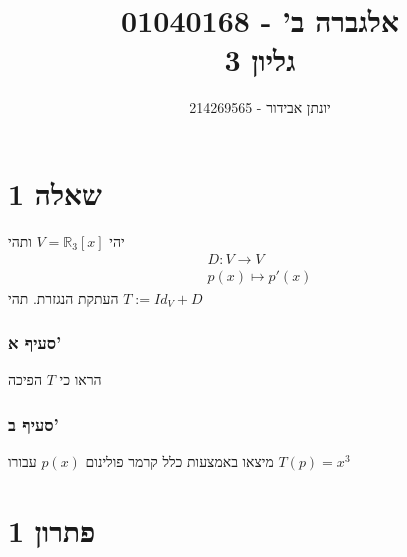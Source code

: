 \documentclass[12pt, titlepage]{article}
\title{אלגברה ב' - 01040168 \\ גליון 3}
\author{יונתן אבידור - 214269565}
\begin{document}
    \newcommand{\adj}[1]{\mathrm{adj}\left(#1\right)}
\maketitle
\pagestyle{fancy}
\fancyhead{}
\part*{שאלה 1}
יהי $V=\mathbb{R}_3\left[x\right]$ ותהי
\begin{gather*}
    D: V\to V\\
    p\left(x\right) \mapsto p'\left(x\right)
\end{gather*}
העתקת הנגזרת. תהי $T:=Id_V  +D$
\section*{סעיף א'}
 הראו כי $T$ הפיכה
 \section*{סעיף ב'}
 מיצאו באמצעות כלל קרמר פולינום $p\left(x\right)$ עבורו $T\left(p\right)=x^3$
\part*{פתרון 1}
\end{document}
